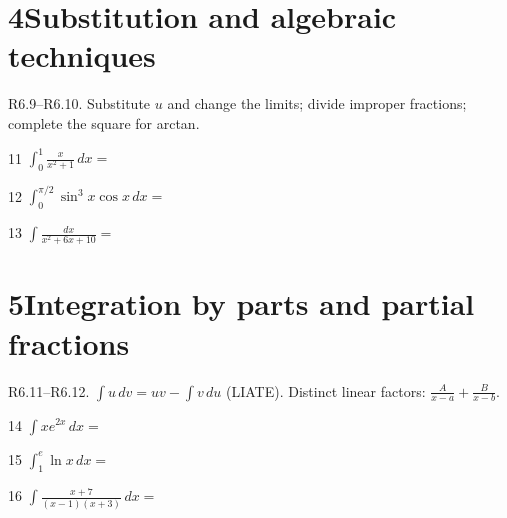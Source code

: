 \documentclass{apcalc}
\begin{document}
\section*{4\quad Substitution and algebraic techniques}
\begin{setrule}R6.9–R6.10. Substitute $u$ and change the limits; divide improper fractions; complete the square for arctan.\end{setrule}
\begin{q}{11}
$\displaystyle\int_0^1\frac{x}{x^2+1}\,dx=$
\end{q}
\begin{q}{12}
$\displaystyle\int_0^{\pi/2}\sin^3x\cos x\,dx=$
\end{q}
\begin{q}{13}
$\displaystyle\int\frac{dx}{x^2+6x+10}=$
\end{q}
\section*{5\quad Integration by parts and partial fractions}
\begin{setrule}R6.11–R6.12. $\int u\,dv=uv-\int v\,du$ (LIATE). Distinct linear factors: $\frac{A}{x-a}+\frac{B}{x-b}$.\end{setrule}
\begin{q}{14}
$\displaystyle\int xe^{2x}\,dx=$
\end{q}
\begin{q}{15}
$\displaystyle\int_1^e\ln x\,dx=$
\end{q}
\begin{q}{16}
$\displaystyle\int\frac{x+7}{(x-1)(x+3)}\,dx=$
\end{q}
\end{document}
